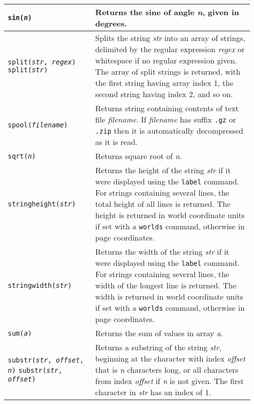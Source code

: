 \begin{longtable}{|p{5cm}|p{7cm}|}
\hline

\texttt{sin(\textit{n})} &
Returns the sine of angle \textit{n}, given in degrees. \\

\hline

\texttt{split(\textit{str}, \textit{regex})}
\texttt{split(\textit{str})} &
Splits the string \textit{str} into an array of strings, delimited by the
regular expression \textit{regex} or whitespace if no regular expression given.
The array of split strings is returned,
with the first string having array index 1, the
second string having index 2, and so on. \\

\hline

\texttt{spool(\textit{filename})} &
Returns string containing contents of text file \textit{filename}.
If \textit{filename} has suffix
\texttt{.gz} or \texttt{.zip}
then it is automatically decompressed as it is read.  \\

\hline

\texttt{sqrt(\textit{n})} &
Returns square root of \textit{n}. \\

\hline

\texttt{stringheight(\textit{str})} &
Returns the height of the string \textit{str}
if it were displayed using the \texttt{label} command.
For strings containing several lines, the total height of all
lines is returned.
The height is returned in world coordinate units if set with a
\texttt{worlds} command, otherwise in page coordinates. \\

\hline

\texttt{stringwidth(\textit{str})} &
Returns the width of the string \textit{str}
if it were displayed using the \texttt{label} command.
For strings containing several lines, the width of the longest
line is returned.
The width is returned in world coordinate units if set with a
\texttt{worlds} command, otherwise in page coordinates. \\

\hline

\texttt{sum(\textit{a})} &
Returns the sum of values in array \textit{a}. \\

\hline

\texttt{substr(\textit{str}, \textit{offset}, \textit{n})}
\texttt{substr(\textit{str}, \textit{offset})} &
Returns a substring of the string \textit{str}, beginning at the
character with index \textit{offset} that is \textit{n} characters long,
or all characters from index \textit{offset} if
\textit{n} is not given.
The first character in \textit{str} has an index of 1. \\


\end{longtable}

